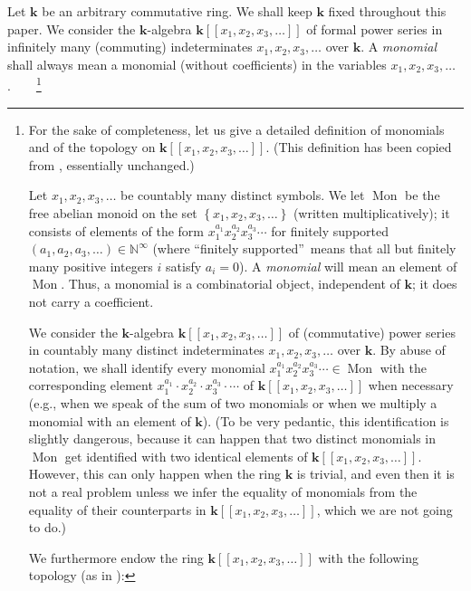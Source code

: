 \documentclass[numbers=enddot,12pt,final,onecolumn,notitlepage,abstracton]{scrartcl}%
\theoremstyle{definition}
\newcommand{\kk}{{\mathbf{k}}}
\newcommand{\Powser}{\mathbf{k}\left[\left[x_1,x_2,x_3,\ldots\right]\right]}
\newcommand{\NN}{{\mathbb{N}}}
\begin{document}
Let $\kk$ be an arbitrary commutative ring. We shall keep $\kk$ fixed
throughout this paper.
We consider the $\kk$-algebra $\Powser$ of formal
power series in infinitely many (commuting) indeterminates
$x_1, x_2, x_3, \ldots$ over $\kk$. A \textit{monomial} shall always
mean a monomial (without coefficients) in the variables
$x_1, x_2, x_3, \ldots$.\ \ \ \ \footnote{For the sake of completeness,
let us give a detailed definition of monomials and of the topology
on $\Powser$. (This definition has been copied from
\cite[\S 2]{Gri-dimm}, essentially unchanged.)

Let $x_{1},x_{2},x_{3},\ldots$ be countably many distinct symbols. We
let $\operatorname{Mon}$ be the free abelian monoid on the set $\left\{
x_{1},x_{2},x_{3},\ldots\right\}  $ (written multiplicatively); it consists of
elements of the form $x_{1}^{a_{1}}x_{2}^{a_{2}}x_{3}^{a_{3}}\cdots$ for
finitely supported $\left(  a_{1},a_{2},a_{3},\ldots\right)  \in
 \NN ^{\infty}$ (where \textquotedblleft finitely
supported\textquotedblright\ means that all but finitely many positive
integers $i$ satisfy $a_{i}=0$). A \textit{monomial} will mean an element of
$\operatorname{Mon}$. Thus, a monomial is a combinatorial
object, independent of $\mathbf{k}$; it does not carry a coefficient.

We consider the $\mathbf{k}$-algebra $\Powser$ of (commutative) power
series in
countably many distinct indeterminates $x_{1},x_{2},x_{3},\ldots$ over
$\mathbf{k}$. By abuse of notation, we shall identify every monomial
$x_{1}^{a_{1}}x_{2}^{a_{2}}x_{3}^{a_{3}}\cdots\in\operatorname{Mon}$ with the
corresponding element $x_{1}^{a_{1}}\cdot x_{2}^{a_{2}}\cdot x_{3}^{a_{3}%
}\cdot\cdots$ of $\Powser$ when necessary
(e.g., when we speak of the sum of two monomials or
when we multiply a monomial with an element of $\mathbf{k}$). (To be
very pedantic, this identification is slightly dangerous, because
it can happen that two distinct monomials in $\operatorname{Mon}$ get
identified with two identical elements of $\Powser$. However, this
can only happen when the ring $\kk$ is trivial, and even then it is
not a real problem unless we infer the equality of monomials from the
equality of their counterparts in $\Powser$, which we are not going to
do.)

We furthermore endow the ring $\Powser$ with the following topology
(as in \cite[Section 2.6]{Reiner}):

}
\end{document}
